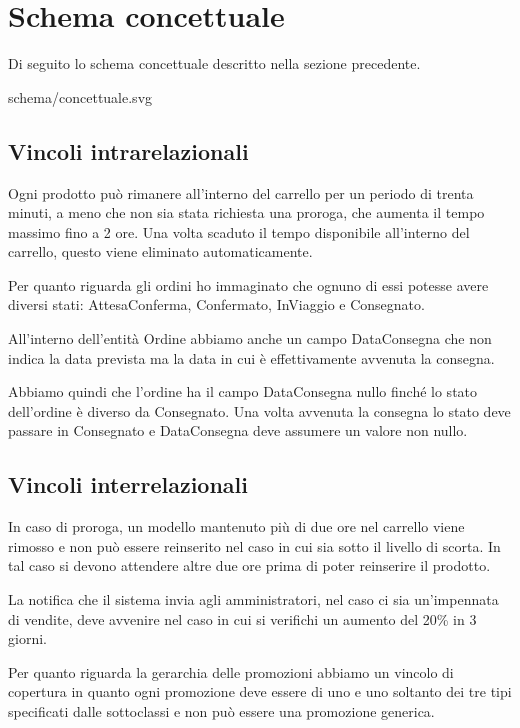 \section{Schema concettuale}
Di seguito lo schema concettuale descritto nella sezione precedente.

\begin{center}
	 {schema/concettuale.svg}
\end{center}
\newpage

\subsection{Vincoli intrarelazionali}
Ogni prodotto può rimanere all'interno del carrello per un periodo di trenta minuti, a meno che
non sia stata richiesta una proroga, che aumenta il tempo massimo fino a 2 ore. Una volta
scaduto il tempo disponibile all'interno del carrello, questo viene eliminato automaticamente.

Per quanto riguarda gli ordini ho immaginato che ognuno di essi potesse avere diversi stati:
AttesaConferma, Confermato, InViaggio e Consegnato.

All'interno dell'entità Ordine abbiamo anche un campo DataConsegna che non indica la data prevista
ma la data in cui è effettivamente avvenuta la consegna.

Abbiamo quindi che l'ordine ha il campo DataConsegna nullo finché lo stato dell'ordine è diverso
da Consegnato. Una volta avvenuta la consegna lo stato deve passare in Consegnato e DataConsegna
deve assumere un valore non nullo.

\subsection{Vincoli interrelazionali}
In caso di proroga, un modello mantenuto più di due ore nel carrello viene rimosso e non può
essere reinserito nel caso in cui sia sotto il livello di scorta. In tal caso si devono attendere
altre due ore prima di poter reinserire il prodotto.

La notifica che il sistema invia agli amministratori, nel caso ci sia un'impennata di vendite,
deve avvenire nel caso in cui si verifichi un aumento del 20\% in 3 giorni.

Per quanto riguarda la gerarchia delle promozioni abbiamo un vincolo di copertura in quanto ogni
promozione deve essere di uno e uno soltanto dei tre tipi specificati dalle sottoclassi e non può
essere una promozione generica.